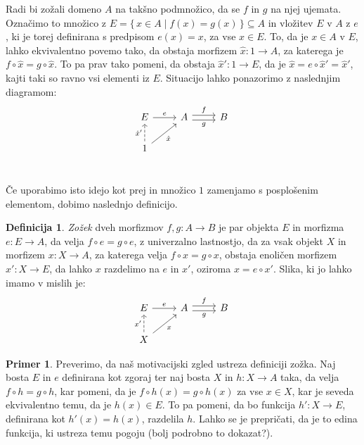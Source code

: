 \documentclass[12pt,a4paper]{book}
\theoremstyle{definition}
\newtheorem{definicija}{Definicija}[chapter]
\theoremstyle{plain}
\theoremstyle{definition}
\newtheorem{primer}{Primer}[section]
\theoremstyle{remark}
\renewcommand{\set}[1]{\{\,#1\,\}}
\begin{document}
Radi bi zožali domeno $A$ na takšno podmnožico, da se $f$ in $g$ na njej ujemata. Označimo to množico z $E = \set{x \in A \mid f(x) = g(x)} \subseteq A$ in vložitev $E$ v $A$ z $e$, ki je torej definirana s predpisom $e(x) = x$, za vse $x \in E$. To, da je $x \in A$ v $E$, lahko ekvivalentno povemo tako, da obstaja morfizem $\hat{x} : 1 \to A$, za katerega je $f \circ \hat{x} = g \circ \hat{x}$. To pa prav tako pomeni, da obstaja $\hat{x}' : 1 \to E$, da je $\hat{x} = e \circ \hat{x}' = \hat{x}'$, kajti taki so ravno vsi elementi iz $E$. Situacijo lahko ponazorimo z naslednjim diagramom:
$$\begin{tikzcd}
E \ar[r, "e"] & A \ar[r, shift left, "f"] \ar[r, shift right, "g"'] & B \\
1 \ar[u, dashed, "\hat{x}'"] \ar[ur, "\hat{x}"'] \\
\end{tikzcd}$$

Če uporabimo isto idejo kot prej in množico $1$ zamenjamo s posplošenim elementom, dobimo naslednjo definicijo.

\begin{definicija}
\textit{Zožek} dveh morfizmov $f, g : A \to B$ je par objekta $E$ in morfizma $e : E \to A$, da velja $f \circ e = g \circ e$, z univerzalno lastnostjo, da za vsak objekt $X$ in morfizem $x : X \to A$, za katerega velja $f \circ x = g \circ x$, obstaja enoličen morfizem $x' : X \to E$, da lahko $x$ razdelimo na $e$ in $x'$, oziroma $x = e \circ x'$.
Slika, ki jo lahko imamo v mislih je:
$$\begin{tikzcd}
E \ar[r, "e"] & A \ar[r, shift left, "f"] \ar[r, shift right, "g"'] & B \\
X \ar[u, dashed, "x'"] \ar[ur, "x"']
\end{tikzcd}$$

\end{definicija}

\begin{primer}
Preverimo, da naš motivacijski zgled ustreza definiciji zožka. Naj bosta $E$ in $e$ definirana kot zgoraj ter naj bosta $X$ in $h:X \to A$ taka, da velja $f \circ h = g \circ h$, kar pomeni, da je $f \circ h(x) = g \circ  h(x)$ za vse $x \in X$, kar je seveda ekvivalentno temu, da je $h(x) \in E$. To pa pomeni, da bo funkcija $h' : X \to E$, definirana kot $h'(x) = h(x)$, razdelila $h$. Lahko se je prepričati, da je to edina funkcija, ki ustreza temu pogoju (bolj podrobno to dokazat?).
\end{primer}
\end{document}
